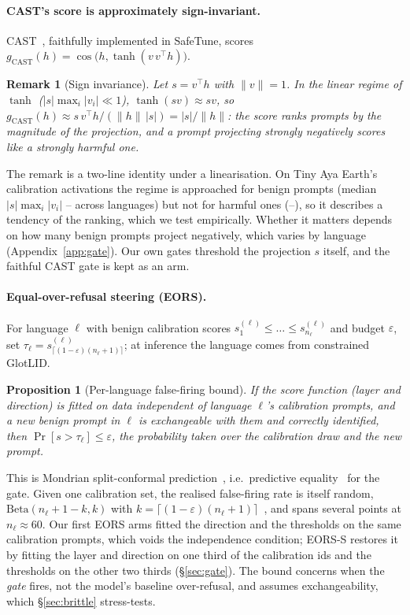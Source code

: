 \documentclass{article}
\newtheorem{proposition}{Proposition}\newtheorem{remark}{Remark}
\begin{document}
\paragraph{CAST's score is approximately sign-invariant.} CAST~\citep{lee2025cast}, faithfully implemented in SafeTune, scores $g_{\text{CAST}}(h)=\cos\!\big(h,\tanh(v\,v^\top h)\big)$.
\begin{remark}[Sign invariance]\label{prop:cast}
Let $s=v^\top h$ with $\|v\|=1$. In the linear regime of $\tanh$ ($|s|\max_i|v_i|\ll 1$), $\tanh(sv)\approx sv$, so $g_{\text{CAST}}(h)\approx s\,v^\top h/(\|h\|\,|s|)=|s|/\|h\|$: the score ranks prompts by the magnitude of the projection, and a prompt projecting strongly \emph{negatively} scores like a strongly harmful one.
\end{remark}
The remark is a two-line identity under a linearisation. On Tiny Aya Earth's calibration activations the regime is approached for benign prompts (median $|s|\max_i|v_i|$ \CastRegimeBenMin--\CastRegimeBenMax{} across languages) but not for harmful ones (\CastRegimeHarmMin--\CastRegimeHarmMax), so it describes a tendency of the ranking, which we test empirically. Whether it matters depends on how many benign prompts project negatively, which varies by language (Appendix~\ref{app:gate}). Our own gates threshold the projection $s$ itself, and the faithful CAST gate is kept as an arm.
\paragraph{Equal-over-refusal steering (EORS).} For language $\ell$ with benign calibration scores $s^{(\ell)}_1\le\dots\le s^{(\ell)}_{n_\ell}$ and budget $\varepsilon$, set $\tau_\ell=s^{(\ell)}_{\lceil(1-\varepsilon)(n_\ell+1)\rceil}$; at inference the language comes from constrained GlotLID.
\begin{proposition}[Per-language false-firing bound]\label{prop:eors}
If the score function (layer and direction) is fitted on data independent of language $\ell$'s calibration prompts, and a new benign prompt in $\ell$ is exchangeable with them and correctly identified, then $\Pr[s>\tau_\ell]\le\varepsilon$, the probability taken over the calibration draw and the new prompt.
\end{proposition}
This is Mondrian split-conformal prediction~\citep{vovk2003mondrian}, i.e.\ predictive equality~\citep{corbettdavies2017cost} for the gate. Given one calibration set, the realised false-firing rate is itself random, $\mathrm{Beta}(n_\ell+1-k,k)$ with $k=\lceil(1-\varepsilon)(n_\ell+1)\rceil$~\citep{angelopoulos2021gentle}, and spans several points at $n_\ell\approx 60$. Our first EORS arms fitted the direction and the thresholds on the same calibration prompts, which voids the independence condition; EORS-S restores it by fitting the layer and direction on one third of the calibration ids and the thresholds on the other two thirds (\S\ref{sec:gate}). The bound concerns when the \emph{gate} fires, not the model's baseline over-refusal, and assumes exchangeability, which \S\ref{sec:brittle} stress-tests.
\end{document}
